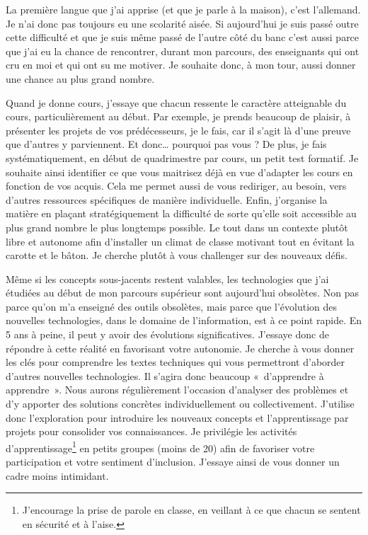 La première langue que j'ai apprise (et que je parle à la maison), c'est l'allemand. Je n'ai donc pas toujours eu une scolarité aisée. Si aujourd'hui je suis passé outre cette difficulté et que je suis même passé de l'autre côté du banc c'est aussi parce que j'ai eu la chance de rencontrer, durant mon parcours, des enseignants qui ont cru en moi et qui ont su me motiver. Je souhaite donc, à mon tour, aussi donner une chance au plus grand nombre.

Quand je donne cours, j’essaye que chacun ressente le caractère atteignable du cours, particulièrement au début. Par exemple, je prends beaucoup de plaisir, à présenter les projets de vos prédécesseurs, je le fais, car il s’agit là d’une preuve que d’autres y parviennent. Et donc… pourquoi pas vous ? De plus, je fais systématiquement, en début de quadrimestre par cours, un petit test formatif. Je souhaite ainsi identifier ce que vous maitrisez déjà en vue d’adapter les cours en fonction de vos acquis. Cela me permet aussi de vous rediriger, au besoin, vers d'autres ressources spécifiques de manière individuelle. Enfin, j'organise la matière en plaçant stratégiquement la difficulté de sorte qu'elle soit accessible au plus grand nombre le plus longtemps possible. Le tout dans un contexte plutôt libre et autonome afin d'installer un climat de classe motivant tout en évitant la carotte et le bâton. Je cherche plutôt à vous challenger sur des nouveaux défis.

Même si les concepts sous-jacents restent valables, les technologies que j'ai étudiées au début de mon parcours supérieur sont aujourd'hui obsolètes. Non pas parce qu'on m'a enseigné des outils obsolètes, mais parce que l'évolution des nouvelles technologies, dans le domaine de l'information, est à ce point rapide. En 5 ans à peine, il peut y avoir des évolutions significatives. J’essaye donc de répondre à cette réalité en favorisant votre autonomie. Je cherche à vous donner les clés pour comprendre les textes techniques qui vous permettront d’aborder d’autres nouvelles technologies. Il s’agira donc beaucoup «~d’apprendre à apprendre~». Nous aurons régulièrement l’occasion d’analyser des problèmes et d’y apporter des solutions concrètes individuellement ou collectivement. J’utilise donc l'exploration pour introduire les nouveaux concepts et l’apprentissage par projets pour consolider vos connaissances. Je privilégie les activités d’apprentissage\footnote{J'encourage la prise de parole en classe, en veillant à ce que chacun se sentent en sécurité et à l'aise.} en petits groupes (moins de 20) afin de favoriser votre participation et votre sentiment d’inclusion. J’essaye ainsi de vous donner un cadre moins intimidant.


